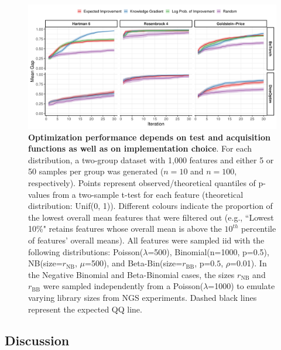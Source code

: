 \begin{figure}[H]
\includegraphics[width=0.99\linewidth]{output/gap_results.png}
\caption{\small \textbf{Optimization performance depends on test and acquisition functions as well as on implementation choice}. For each distribution, a two-group dataset with 1,000 features and either 5 or 50 samples per group was generated ($n=10$ and $n=100$, respectively). Points represent observed/theoretical quantiles of p-values from a two-sample t-test for each feature (theoretical distribution: Unif(0, 1)). Different colours indicate the proportion of the lowest overall mean features that were filtered out (e.g., ``Lowest 10\%" retains features whose overall mean is above the $10^{th}$ percentile of features' overall means). All features were sampled iid with the following distributions: Poisson($\lambda$=500), Binomial(n=1000, p=0.5), NB(size=$r_{\text{NB}}$, $\mu$=500), and Beta-Bin(size=$r_{\text{BB}}$, p=$0.5$, $\rho$=0.01). In the Negative Binomial and Beta-Binomial cases, the sizes $r_{\text{NB}}$ and $r_{\text{BB}}$ were sampled independently from a Poisson($\lambda$=1000) to emulate varying library sizes from NGS experiments. Dashed black lines represent the expected QQ line.}
\label{fig:gap}
\end{figure}

\subsection{Discussion}